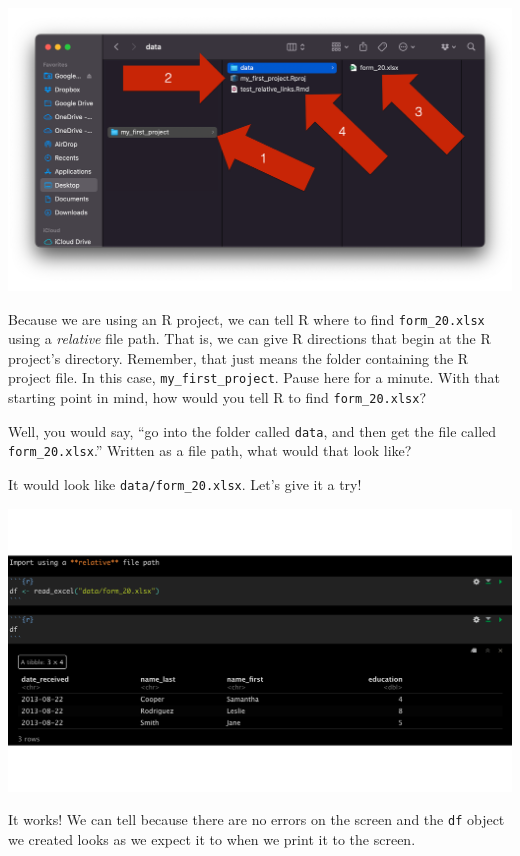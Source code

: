 \documentclass[
  letterpaper,
  DIV=11,
  numbers=noendperiod]{scrreprt}
\begin{document}
\includegraphics{chapters/file_paths/relative_file_paths_04_check_files.png}

Because we are using an R project, we can tell R where to find
\texttt{form\_20.xlsx} using a \emph{relative} file path. That is, we
can give R directions that begin at the R project's directory. Remember,
that just means the folder containing the R project file. In this case,
\texttt{my\_first\_project}. Pause here for a minute. With that starting
point in mind, how would you tell R to find \texttt{form\_20.xlsx}?

Well, you would say, ``go into the folder called \texttt{data}, and then
get the file called \texttt{form\_20.xlsx}.'' Written as a file path,
what would that look like?

It would look like \texttt{data/form\_20.xlsx}. Let's give it a try!

\includegraphics{chapters/file_paths/relative_file_paths_05_relative_path_brad.png}

It works! We can tell because there are no errors on the screen and the
\texttt{df} object we created looks as we expect it to when we print it
to the screen.
\end{document}
